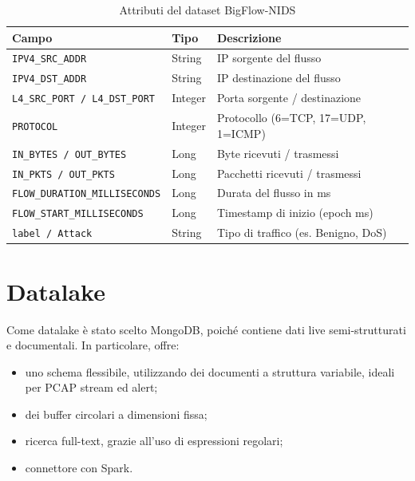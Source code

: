 \documentclass[10pt,a4paper]{article}
\begin{document}
    \begin{table}[H]
        \centering
        \small
        \begin{tabularx}{\textwidth}{@{}llX@{}}
        \toprule
        \textbf{Campo} & \textbf{Tipo} & \textbf{Descrizione} \\
        \midrule
        \texttt{IPV4\_SRC\_ADDR}              & String  & IP sorgente del flusso \\
        \texttt{IPV4\_DST\_ADDR}              & String  & IP destinazione del flusso \\
        \texttt{L4\_SRC\_PORT / L4\_DST\_PORT}& Integer & Porta sorgente / destinazione \\
        \texttt{PROTOCOL}                     & Integer & Protocollo (6=TCP, 17=UDP, 1=ICMP) \\
        \texttt{IN\_BYTES / OUT\_BYTES}        & Long    & Byte ricevuti / trasmessi \\
        \texttt{IN\_PKTS / OUT\_PKTS}          & Long    & Pacchetti ricevuti / trasmessi \\
        \texttt{FLOW\_DURATION\_MILLISECONDS}  & Long    & Durata del flusso in ms \\
        \texttt{FLOW\_START\_MILLISECONDS}     & Long    & Timestamp di inizio (epoch ms) \\
        \texttt{label / Attack}               & String  & Tipo di traffico (es. Benigno, DoS) \\
        \bottomrule
        \end{tabularx}
        \caption{Attributi del dataset BigFlow-NIDS}
        \label{tab:schema}
    \end{table}
    \section{Datalake}
    Come datalake è stato scelto MongoDB, poiché contiene dati live semi-strutturati e documentali. In particolare, offre:
    \begin{itemize}
        \item uno schema flessibile, utilizzando dei documenti a struttura variabile, ideali per PCAP stream ed alert;
        \item dei buffer circolari a dimensioni fissa;
        \item ricerca full-text, grazie all'uso di espressioni regolari;
        \item connettore con Spark.
    \end{itemize}
\end{document}
